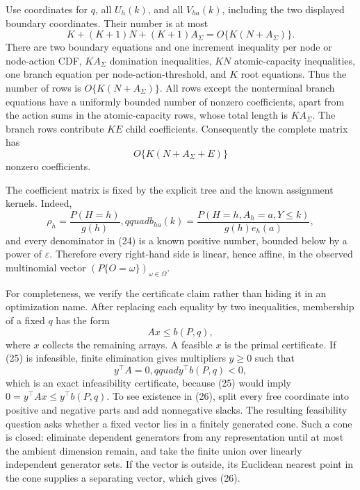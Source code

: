 Use coordinates for \(q\), all \(U_h(k)\), and all \(V_{ha}(k)\), including the two displayed boundary coordinates.  Their number is at most
\[
 K+(K+1)N+(K+1)A_\Sigma=O\{K(N+A_\Sigma)\}.              \tag{22}
\]
There are two boundary equations and one increment inequality per node or node-action CDF, \(K A_\Sigma\) domination inequalities, \(K N\) atomic-capacity inequalities, one branch equation per node-action-threshold, and \(K\) root equations.  Thus the number of rows is \(O\{K(N+A_\Sigma)\}\).  All rows except the nonterminal branch equations have a uniformly bounded number of nonzero coefficients, apart from the action sums in the atomic-capacity rows, whose total length is \(K A_\Sigma\).  The branch rows contribute \(K E\) child coefficients.  Consequently the complete matrix has
\[
 O\{K(N+A_\Sigma+E)\}                                    \tag{23}
\]
nonzero coefficients.

The coefficient matrix is fixed by the explicit tree and the known assignment kernels.  Indeed,
\[
 \rho_h=\frac{P(H=h)}{g(h)},qquad
 b_{ha}(k)=\frac{P(H=h,A_h=a,Y\leq k)}{g(h)e_h(a)},        \tag{24}
\]
and every denominator in (24) is a known positive number, bounded below by a power of \(\varepsilon\).  Therefore every right-hand side is linear, hence affine, in the observed multinomial vector \((P\{O=\omega\})_{\omega\in\Omega}\).

For completeness, we verify the certificate claim rather than hiding it in an optimization name.  After replacing each equality by two inequalities, membership of a fixed \(q\) has the form
\[
 Ax\leq b(P,q),                                           \tag{25}
\]
where \(x\) collects the remaining arrays.  A feasible \(x\) is the primal certificate.  If (25) is infeasible, finite elimination gives multipliers \(y\geq0\) such that
\[
 y^\top A=0,qquad y^\top b(P,q)<0,                       \tag{26}
\]
which is an exact infeasibility certificate, because (25) would imply \(0=y^\top Ax\leq y^\top b(P,q)\).  To see existence in (26), split every free coordinate into positive and negative parts and add nonnegative slacks.  The resulting feasibility question asks whether a fixed vector lies in a finitely generated cone.  Such a cone is closed: eliminate dependent generators from any representation until at most the ambient dimension remain, and take the finite union over linearly independent generator sets.  If the vector is outside, its Euclidean nearest point in the cone supplies a separating vector, which gives (26).

